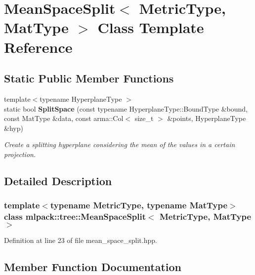 \section{Mean\+Space\+Split$<$ Metric\+Type, Mat\+Type $>$ Class Template Reference}
\label{classmlpack_1_1tree_1_1MeanSpaceSplit}
\subsection*{Static Public Member Functions}
\begin{DoxyCompactItemize}
\item 
{\footnotesize template$<$typename Hyperplane\+Type $>$ }\\static bool \textbf{ Split\+Space} (const typename Hyperplane\+Type\+::\+Bound\+Type \&bound, const Mat\+Type \&data, const arma\+::\+Col$<$ size\+\_\+t $>$ \&points, Hyperplane\+Type \&hyp)
\begin{DoxyCompactList}\small\item\em Create a splitting hyperplane considering the mean of the values in a certain projection. \end{DoxyCompactList}\end{DoxyCompactItemize}


\subsection{Detailed Description}
\subsubsection*{template$<$typename Metric\+Type, typename Mat\+Type$>$\newline
class mlpack\+::tree\+::\+Mean\+Space\+Split$<$ Metric\+Type, Mat\+Type $>$}



Definition at line 23 of file mean\+\_\+space\+\_\+split.\+hpp.



\subsection{Member Function Documentation}
\mbox{\label{classmlpack_1_1tree_1_1MeanSpaceSplit_a055fe300d8af558a4d1d1097373740ed}} 
